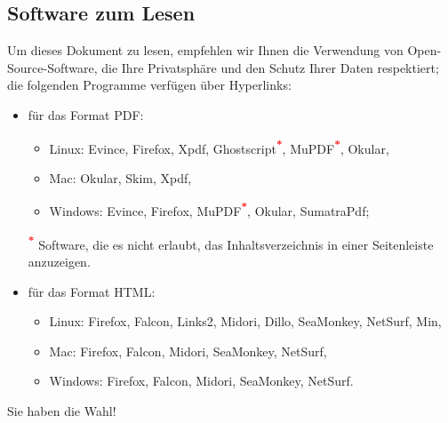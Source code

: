 \subsection{Software zum Lesen\label{introduction-manual-readers}}

Um dieses Dokument zu lesen, empfehlen wir Ihnen die Verwendung von Open-Source-Software, die Ihre Privatsphäre und den Schutz Ihrer Daten respektiert; die folgenden Programme verfügen über \gls{Hyperlinks}: 
\begin{itemize}
	\item für das Format \gls{PDF}:%
		\begin{itemize}
			\item[\textopenbullet] Linux: Evince, Firefox, Xpdf, Ghostscript\textsuperscript{\textcolor{red}{\textbf{*}}}, MuPDF\textsuperscript{\textcolor{red}{\textbf{*}}}, Okular,
			\item[\textopenbullet] Mac: Okular, Skim, Xpdf,
			\item[\textopenbullet] Windows: Evince, Firefox, MuPDF\textsuperscript{\textcolor{red}{\textbf{*}}}, Okular, SumatraPdf;
		\end{itemize}
		\textsuperscript{\textcolor{red}{\textbf{*}}} Software, die es nicht erlaubt, das Inhaltsverzeichnis in einer Seitenleiste anzuzeigen.%
	\item für das Format \gls{HTML}:%
		\begin{itemize}
			\item[\textopenbullet] Linux: Firefox, Falcon, Links2, Midori, Dillo, SeaMonkey, NetSurf, Min,
			\item[\textopenbullet] Mac: Firefox, Falcon, Midori, SeaMonkey, NetSurf,
			\item[\textopenbullet] Windows: Firefox, Falcon, Midori, SeaMonkey, NetSurf.
		\end{itemize}
\end{itemize}

Sie haben die Wahl!%

